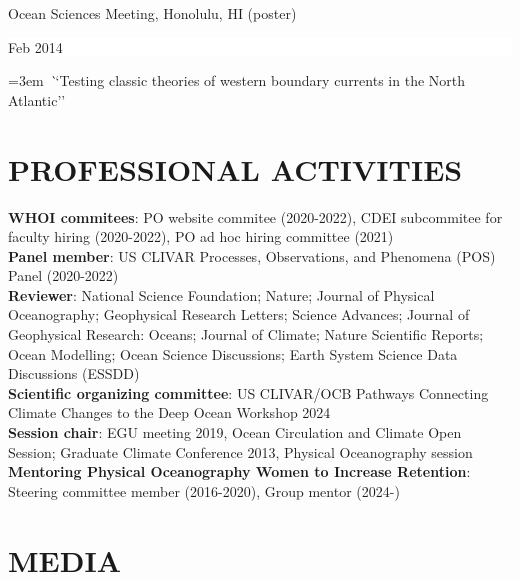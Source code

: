 \documentclass[paper=letter,fontsize=11pt]{scrartcl} %
\newcommand{\sepspace}{\vspace*{3mm}}		%
\newcommand{\NewPart}[2]{\section*{\uppercase{#1} #2}}
\newcommand{\ShortEntry}[2]{\normalsize \noindent \textbf{#1}: #2 \\ }
\newcommand{\TalkEntry}[3]{
		\noindent #1 \hfill      %
		\colorbox{White}{%
			\parbox{6em}{%
			\hfill\color{Black}#2}} \par  %
		\noindent\hangindent=3em\hangafter=0 \textit ``#3''\sepspace} %
\begin{document}
\TalkEntry{Ocean Sciences Meeting, Honolulu, HI (poster)}{Feb 2014}{Testing classic theories of western boundary currents in the North Atlantic}



\NewPart{Professional Activities}{}

\ShortEntry{WHOI commitees}{PO website commitee (2020-2022), CDEI subcommitee for faculty hiring (2020-2022), PO ad hoc hiring committee (2021)}

\ShortEntry{Panel member}{US CLIVAR Processes, Observations, and Phenomena (POS) Panel (2020-2022)}

\ShortEntry{Reviewer}{National Science Foundation; Nature; Journal of Physical Oceanography; Geophysical Research Letters; Science Advances; Journal of Geophysical Research: Oceans; Journal of Climate; Nature Scientific Reports; Ocean Modelling; Ocean Science Discussions; Earth System Science Data Discussions (ESSDD)}

\ShortEntry{Scientific organizing committee}{US CLIVAR/OCB Pathways Connecting Climate Changes to the Deep Ocean Workshop 2024}

\ShortEntry{Session chair}{EGU meeting 2019, Ocean Circulation and Climate Open Session; Graduate Climate Conference 2013, Physical Oceanography session}

\ShortEntry{Mentoring Physical Oceanography Women to Increase Retention}{Steering committee member (2016-2020), Group mentor (2024-)}




\NewPart{Media}{}
\end{document}
